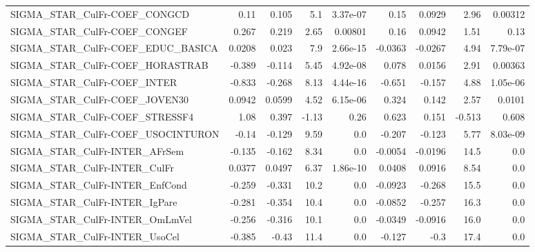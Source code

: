 \begin{tabular}{lrrrrrrrr}
SIGMA\_STAR\_CulFr-COEF\_CONGCD          &        0.11 &        0.105 &     5.1 & 3.37e-07 &       0.15 &      0.0929 &         2.96 &       0.00312 \\
SIGMA\_STAR\_CulFr-COEF\_CONGEF          &       0.267 &        0.219 &    2.65 &  0.00801 &       0.16 &      0.0942 &         1.51 &          0.13 \\
SIGMA\_STAR\_CulFr-COEF\_EDUC\_BASICA     &      0.0208 &        0.023 &     7.9 & 2.66e-15 &    -0.0363 &     -0.0267 &         4.94 &      7.79e-07 \\
SIGMA\_STAR\_CulFr-COEF\_HORASTRAB       &      -0.389 &       -0.114 &    5.45 & 4.92e-08 &      0.078 &      0.0156 &         2.91 &       0.00363 \\
SIGMA\_STAR\_CulFr-COEF\_INTER           &      -0.833 &       -0.268 &    8.13 & 4.44e-16 &     -0.651 &      -0.157 &         4.88 &      1.05e-06 \\
SIGMA\_STAR\_CulFr-COEF\_JOVEN30         &      0.0942 &       0.0599 &    4.52 & 6.15e-06 &      0.324 &       0.142 &         2.57 &        0.0101 \\
SIGMA\_STAR\_CulFr-COEF\_STRESSF4        &        1.08 &        0.397 &   -1.13 &     0.26 &      0.623 &       0.151 &       -0.513 &         0.608 \\
SIGMA\_STAR\_CulFr-COEF\_USOCINTURON     &       -0.14 &       -0.129 &    9.59 &      0.0 &     -0.207 &      -0.123 &         5.77 &      8.03e-09 \\
SIGMA\_STAR\_CulFr-INTER\_AFrSem         &      -0.135 &       -0.162 &    8.34 &      0.0 &    -0.0054 &     -0.0196 &         14.5 &           0.0 \\
SIGMA\_STAR\_CulFr-INTER\_CulFr          &      0.0377 &       0.0497 &    6.37 & 1.86e-10 &     0.0408 &      0.0916 &         8.54 &           0.0 \\
SIGMA\_STAR\_CulFr-INTER\_EnfCond        &      -0.259 &       -0.331 &    10.2 &      0.0 &    -0.0923 &      -0.268 &         15.5 &           0.0 \\
SIGMA\_STAR\_CulFr-INTER\_IgPare         &      -0.281 &       -0.354 &    10.4 &      0.0 &    -0.0852 &      -0.257 &         16.3 &           0.0 \\
SIGMA\_STAR\_CulFr-INTER\_OmLmVel        &      -0.256 &       -0.316 &    10.1 &      0.0 &    -0.0349 &     -0.0916 &         16.0 &           0.0 \\
SIGMA\_STAR\_CulFr-INTER\_UsoCel         &      -0.385 &        -0.43 &    11.4 &      0.0 &     -0.127 &        -0.3 &         17.4 &           0.0 \\

\end{tabular}
